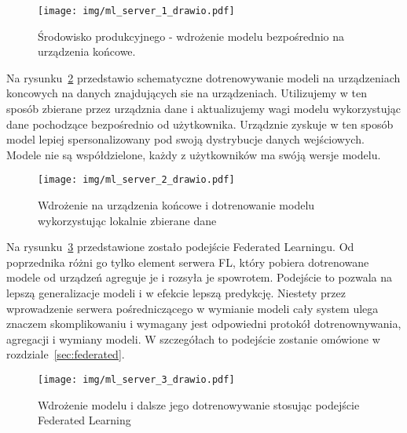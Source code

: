 \begin{figure}[h!]\label{fig:deploy-1}
    \centering
    \texttt{[image: img/ml\_server\_1\_drawio.pdf]}
    \caption{Środowisko produkcyjnego - wdrożenie modelu bezpośrednio na urządzenia końcowe.}
    \vspace{-4mm}
\end{figure}

Na rysunku~\ref{fig:deploy-2} przedstawio schematyczne dotrenowywanie modeli na urządzeniach
koncowych na danych znajdujących sie na urządzeniach. Utilizujemy w ten sposób zbierane przez urządznia dane i aktualizujemy wagi modelu wykorzystując dane pochodzące bezpośrednio od użytkownika. Urządznie zyskuje w ten sposób model
lepiej spersonalizowany pod swoją dystrybucje danych wejściowych. Modele nie są współdzielone,
każdy z użytkowników ma swóją wersje modelu.

\begin{figure}[h!]\label{fig:deploy-2}
    \centering
    \texttt{[image: img/ml\_server\_2\_drawio.pdf]}
    \caption{Wdrożenie na urządzenia końcowe i dotrenowanie modelu wykorzystując lokalnie zbierane dane}
    \vspace{-4mm}
\end{figure}

Na rysunku~\ref{fig:deploy-3} przedstawione zostało podejście Federated Learningu. Od poprzednika
różni go tylko element serwera FL, który pobiera dotrenowane modele od urządzeń agreguje je i
rozsyła je spowrotem. Podejście to pozwala na lepszą generalizacje modeli i w efekcie lepszą
predykcję. Niestety przez wprowadzenie serwera pośredniczącego w wymianie modeli cały system
ulega znaczem skomplikowaniu i wymagany jest odpowiedni protokół dotrenownywania, agregacji i
wymiany modeli. W szczegółach to podejście zostanie omówione w rozdziale~\ref{sec:federated}.

\begin{figure}[h!]\label{fig:deploy-3}
    \centering
    \texttt{[image: img/ml\_server\_3\_drawio.pdf]}
    \caption{Wdrożenie modelu i dalsze jego dotrenowywanie stosując podejście Federated Learning}
    \vspace{-4mm}
\end{figure}
